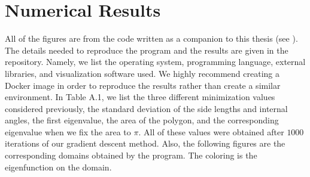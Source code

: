 \documentclass[12pt]{report}
\numberwithin{definition}{section}
\begin{document}
\appendix
\chapter{Numerical Results}
\break

All of the figures are from the code written as a companion to this thesis (see \cite{code}).
The details needed to reproduce the program and the results are given in the repository.
Namely, we list the operating system, programming language, external libraries, and visualization software used.
We highly recommend creating a Docker image in order to reproduce the results rather than create a similar environment.
In Table A.1, we list the three different minimization values considered previously, the standard deviation of the side lengths and internal angles, the first eigenvalue, the area of the polygon, and the corresponding eigenvalue when we fix the area to $\pi$.
All of these values were obtained after $1000$ iterations of our gradient descent method.
Also, the following figures are the corresponding domains obtained by the program.
The coloring is the eigenfunction on the domain.
\end{document}
